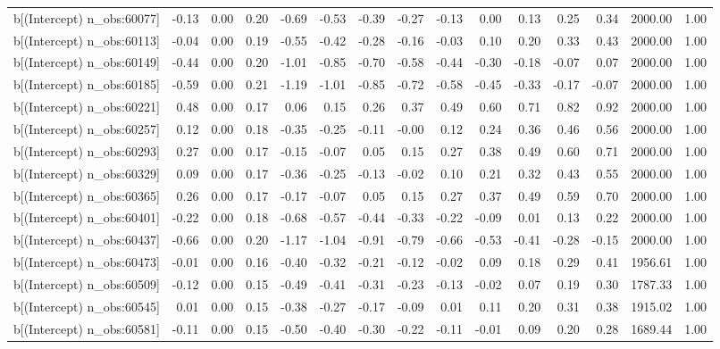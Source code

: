 \begin{table}[ht]
\begin{tabular}{rrrrrrrrrrrrrrr}
  b[(Intercept) n\_obs:60077] & -0.13 & 0.00 & 0.20 & -0.69 & -0.53 & -0.39 & -0.27 & -0.13 & 0.00 & 0.13 & 0.25 & 0.34 & 2000.00 & 1.00 \\ 
  b[(Intercept) n\_obs:60113] & -0.04 & 0.00 & 0.19 & -0.55 & -0.42 & -0.28 & -0.16 & -0.03 & 0.10 & 0.20 & 0.33 & 0.43 & 2000.00 & 1.00 \\ 
  b[(Intercept) n\_obs:60149] & -0.44 & 0.00 & 0.20 & -1.01 & -0.85 & -0.70 & -0.58 & -0.44 & -0.30 & -0.18 & -0.07 & 0.07 & 2000.00 & 1.00 \\ 
  b[(Intercept) n\_obs:60185] & -0.59 & 0.00 & 0.21 & -1.19 & -1.01 & -0.85 & -0.72 & -0.58 & -0.45 & -0.33 & -0.17 & -0.07 & 2000.00 & 1.00 \\ 
  b[(Intercept) n\_obs:60221] & 0.48 & 0.00 & 0.17 & 0.06 & 0.15 & 0.26 & 0.37 & 0.49 & 0.60 & 0.71 & 0.82 & 0.92 & 2000.00 & 1.00 \\ 
  b[(Intercept) n\_obs:60257] & 0.12 & 0.00 & 0.18 & -0.35 & -0.25 & -0.11 & -0.00 & 0.12 & 0.24 & 0.36 & 0.46 & 0.56 & 2000.00 & 1.00 \\ 
  b[(Intercept) n\_obs:60293] & 0.27 & 0.00 & 0.17 & -0.15 & -0.07 & 0.05 & 0.15 & 0.27 & 0.38 & 0.49 & 0.60 & 0.71 & 2000.00 & 1.00 \\ 
  b[(Intercept) n\_obs:60329] & 0.09 & 0.00 & 0.17 & -0.36 & -0.25 & -0.13 & -0.02 & 0.10 & 0.21 & 0.32 & 0.43 & 0.55 & 2000.00 & 1.00 \\ 
  b[(Intercept) n\_obs:60365] & 0.26 & 0.00 & 0.17 & -0.17 & -0.07 & 0.05 & 0.15 & 0.27 & 0.37 & 0.49 & 0.59 & 0.70 & 2000.00 & 1.00 \\ 
  b[(Intercept) n\_obs:60401] & -0.22 & 0.00 & 0.18 & -0.68 & -0.57 & -0.44 & -0.33 & -0.22 & -0.09 & 0.01 & 0.13 & 0.22 & 2000.00 & 1.00 \\ 
  b[(Intercept) n\_obs:60437] & -0.66 & 0.00 & 0.20 & -1.17 & -1.04 & -0.91 & -0.79 & -0.66 & -0.53 & -0.41 & -0.28 & -0.15 & 2000.00 & 1.00 \\ 
  b[(Intercept) n\_obs:60473] & -0.01 & 0.00 & 0.16 & -0.40 & -0.32 & -0.21 & -0.12 & -0.02 & 0.09 & 0.18 & 0.29 & 0.41 & 1956.61 & 1.00 \\ 
  b[(Intercept) n\_obs:60509] & -0.12 & 0.00 & 0.15 & -0.49 & -0.41 & -0.31 & -0.23 & -0.13 & -0.02 & 0.07 & 0.19 & 0.30 & 1787.33 & 1.00 \\ 
  b[(Intercept) n\_obs:60545] & 0.01 & 0.00 & 0.15 & -0.38 & -0.27 & -0.17 & -0.09 & 0.01 & 0.11 & 0.20 & 0.31 & 0.38 & 1915.02 & 1.00 \\ 
  b[(Intercept) n\_obs:60581] & -0.11 & 0.00 & 0.15 & -0.50 & -0.40 & -0.30 & -0.22 & -0.11 & -0.01 & 0.09 & 0.20 & 0.28 & 1689.44 & 1.00 \\ 

\end{tabular}
\end{table}
